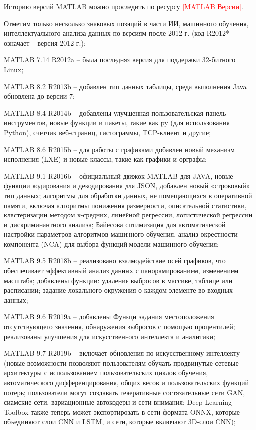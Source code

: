 Историю версий MATLAB можно проследить по ресурсу \textcolor{red}{[MATLAB Версии]}.

Отметим только несколько знаковых позиций в части ИИ, машинного обучения, интеллектуального анализа данных по версиям после 2012 г. (код R2012* означает -- версия 2012 г.):
\begin{textitemize}
	\item MATLAB 7.14 R2012a -- была последняя версия для поддержки 32-битного Linux;
	\item MATLAB 8.2 R2013b -- добавлен тип данных таблицы, среда выполнения Java обновлена до версии 7;
	\item MATLAB 8.4 R2014b -- добавлены улучшенная пользовательская панель инструментов, новые функции и пакеты, такие как py (для использования Python), счетчик веб-страниц, гистограммы, TCP-клиент и другие;
	\item MATLAB 8.6 R2015b -- для работы с графиками добавлен новый механизм исполнения (LXE) и новые классы, такие как графики и орграфы;
	\item MATLAB 9.1 R2016b -- официальный движок MATLAB для JAVA, новые функции кодирования и декодирования для JSON, добавлен новый «строковый» тип данных; алгоритмы для обработки данных, не помещающихся в оперативной памяти, включая алгоритмы понижения размерности, описательной статистики, кластеризации методом к-средних, линейной регрессии, логистической регрессии и дискриминантного анализа; Байесова оптимизация для автоматической настройки параметров алгоритмов машинного обучения, анализ окрестности компонента (NCA) для выбора функций модели машинного обучения;
	\item MATLAB 9.5 R2018b -- реализовано взаимодействие осей графиков, что обеспечивает эффективный анализ данных с панорамированием, изменением масштаба; добавлены функции: удаление выбросов в массиве, таблице или расписании; задание локального окружения о каждом элементе во входных данных; 
	\item MATLAB 9.6 R2019a -- добавлены Функци задания местоположения отсутствующего значения, обнаружения выбросов с помощью процентилей; реализованы улучшения для искусственного интеллекта и аналитики; 
	\item MATLAB 9.7 R2019b -- включает обновления по искусственному интеллекту (новые возможности позволяют пользователям обучать продвинутые сетевые архитектуры с использованием пользовательских циклов обучения, автоматического дифференцирования, общих весов и пользовательских функций потерь; пользователи могут создавать генеративные состязательные сети GAN, сиамские сети, вариационные автокодеры и сети внимания; Deep Learning Toolbox также теперь может экспортировать в сети формата ONNX, которые объединяют слои CNN и LSTM, и сети, которые включают 3D-слои CNN); 

\end{textitemize}

